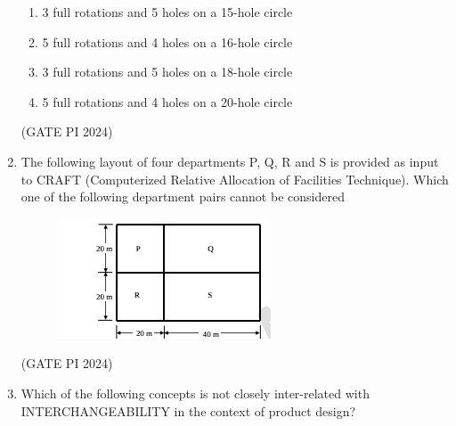 \documentclass[journal,12pt,onecolumn]{IEEEtran}
\theoremstyle{remark}
\begin{document}
\begin{enumerate}
\begin{enumerate}
    \item 3 full rotations and 5 holes on a 15-hole circle
    \item 5 full rotations and 4 holes on a 16-hole circle
    \item 3 full rotations and 5 holes on a 18-hole circle
    \item 5 full rotations and 4 holes on a 20-hole circle
\end{enumerate}

\hfill (GATE PI 2024)

\item The following layout of four departments P, Q, R and S is provided as input to CRAFT (Computerized Relative Allocation of Facilities Technique). Which one of the following department pairs cannot be considered

\begin{figure}[H]
\centering
\includegraphics[width=0.5\columnwidth]{fig6.png}
\caption{}
\end{figure}


\begin{enumerate}
\end{enumerate}

\hfill (GATE PI 2024)

\item Which of the following concepts is not closely inter-related with INTERCHANGEABILITY in the context of product design?

\begin{enumerate}
\end{enumerate}


\end{enumerate}
\end{document}
